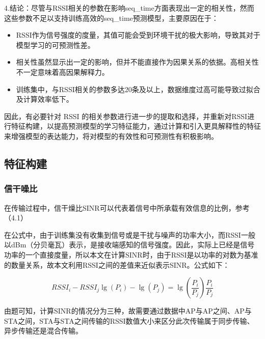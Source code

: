 4.结论：尽管与RSSI相关的参数在影响seq\_time方面表现出一定的相关性，然而这些参数不足以支持训练高效的seq\_time预测模型，主要原因在于：

\begin{itemize}
	\item RSSI作为信号强度的度量，其值可能会受到环境干扰的极大影响，导致其对于模型学习的可预测性差。
	\item 相关性虽然显示出一定的影响，但并不能直接作为因果关系的依据。高相关性不一定意味着高因果解释力。
	\item 训练集中，与RSSI相关的参数多达20条及以上，数据维度过高可能导致过拟合及计算效率低下。
\end{itemize}

因此，有必要针对 RSSI 的相关参数进行进一步的提取和选择，并重新对RSSI进行特征构建，以提高预测模型的学习特征能力，通过计算和引入更具解释性的特征来增强模型的表达能力，将对模型的有效性和可预测性有积极影响。


\subsection{特征构建}


\subsubsection{信干噪比}

在传输过程中，信干燥比SINR可以代表着信号中所承载有效信息的比例，参考（4.1）



在公式中，由于训练集没有收集到信号或是干扰与噪声的功率大小，而RSSI一般以dBm（分贝毫瓦）表示，是接收端感知的信号强度。因此，实际上已经是信号功率的一个直接度量，所以本文在计算SINR时，由于RSSI是以功率的对数为基准的数量关系，故本文利用RSSI之间的差值来近似表示SINR。公式如下：


\begin{equation}
	RSSI_i-RSSI_j\lg \left( P_i \right) -\lg \left( P_j \right) =\lg \left( \frac{P_i}{P_j} \right) \frac{P_i}{P_j}
\end{equation}

由题可知，计算SINR的情况分为三种，故需要通过数据中AP与AP之间、AP与STA之间，STA与STA之间传输的RSSI数值大小来区分此次传输属于同步传输、异步传输还是混合传输。

